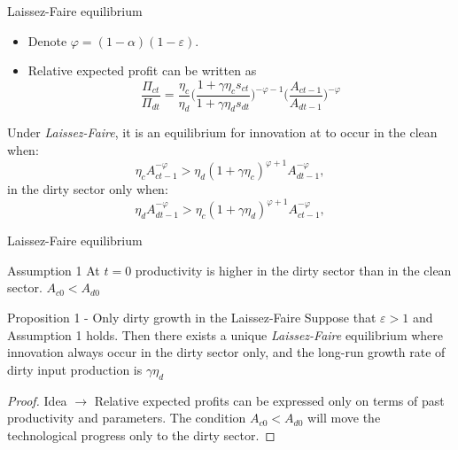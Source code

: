 \documentclass[aspectratio=169,xcolor=dvipsnames]{beamer}
\begin{document}
\begin{frame}{Laissez-Faire equilibrium}
    \begin{itemize}
        \item Denote $\varphi=(1-\alpha)(1-\varepsilon)$.
        \item Relative expected profit can be written as 
        \begin{equation*}
             \frac{\Pi_{ct} }{\Pi_{dt} } =  \frac{\eta_c}{\eta_d} \bigg( \frac{1+\gamma \eta_c s_{ct}}{1+ \gamma \eta_d s_{dt}}\bigg)^{-\varphi-1} \Bigg( \frac{A_{ct-1}}{A_{dt-1}}\Bigg)^{-\varphi}
        \end{equation*}
    \end{itemize}
    \begin{lemma}
        Under \textit{Laissez-Faire}, it is an equilibrium for innovation at  to occur in the clean when:
        \begin{equation*}
            \eta_c A_{c t-1}^{-\varphi} > \eta_d(1+\gamma \eta_c)^{\varphi+1}A_{dt-1}^{-\varphi},
        \end{equation*}
        in the dirty sector only when:
        \begin{equation*}
            \eta_d A_{d t-1}^{-\varphi} > \eta_c(1+\gamma \eta_d)^{\varphi+1}A_{ct-1}^{-\varphi},
        \end{equation*}
\end{lemma}
\end{frame}


\begin{frame}{Laissez-Faire equilibrium}
\begin{block}{Assumption 1}
    At $t=0$ productivity is higher in the dirty sector than in the clean sector.
    $A_{c0} < A_{d0} $
\end{block}
\begin{block}{Proposition 1 - Only dirty growth in the Laissez-Faire}
        Suppose that $\varepsilon >1$ and Assumption 1 holds. Then there exists a unique \textit{Laissez-Faire} equilibrium where innovation always occur in the dirty sector only, and the long-run growth rate of dirty input production is $\gamma \eta _d$
    \end{block}
    \begin{proof}
    Idea $\rightarrow$ Relative expected profits can be expressed only on terms of past productivity and parameters. The condition $A_{c0} < A_{d0}$ will move the technological progress only to the dirty sector.
    \end{proof}
\end{frame}
\end{document}
